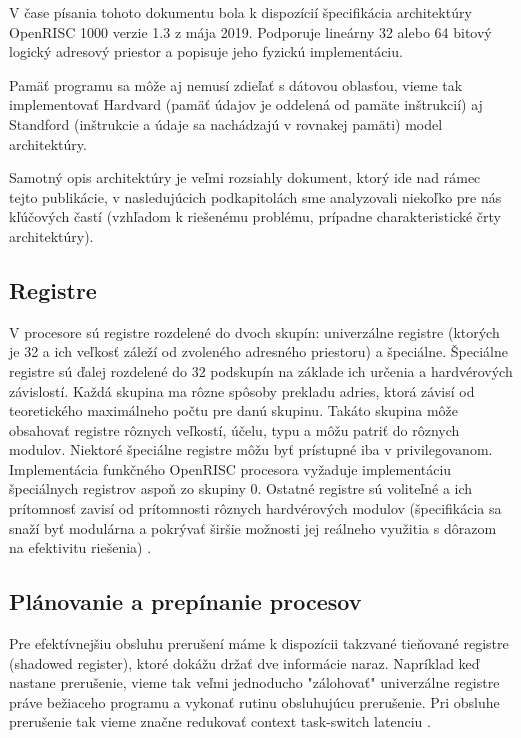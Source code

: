 \documentclass[conference]{IEEEtran}
\begin{document}
V čase písania tohoto dokumentu bola k dispozícií špecifikácia architektúry OpenRISC 1000 verzie 1.3 z mája 2019. Podporuje lineárny 32 alebo 64 bitový logický adresový priestor a popisuje jeho fyzickú implementáciu. 

Pamäť programu sa môže aj nemusí zdieľať s dátovou oblasťou, vieme tak implementovať Hardvard (pamäť údajov je oddelená od pamäte inštrukcií) aj Standford (inštrukcie a údaje sa nachádzajú v rovnakej pamäti) model architektúry.

Samotný opis architektúry je veľmi rozsiahly dokument, ktorý ide nad rámec tejto publikácie, v nasledujúcich podkapitolách sme analyzovali niekoľko pre nás kľúčových častí (vzhľadom k riešenému problému, prípadne charakteristické črty architektúry).

\subsection{Registre}

V procesore sú registre rozdelené do dvoch skupín: univerzálne registre (ktorých je 32 a ich veľkosť záleží od zvoleného adresného priestoru) a špeciálne. Špeciálne registre sú ďalej rozdelené do 32 podskupín na základe ich určenia a hardvérových závislostí. Každá skupina ma rôzne spôsoby prekladu adries, ktorá závisí od teoretického maximálneho počtu pre danú skupinu. Takáto skupina môže obsahovať registre rôznych veľkostí, účelu, typu a môžu patriť do rôznych modulov. Niektoré špeciálne registre môžu byť prístupné iba v privilegovanom. Implementácia funkčného OpenRISC procesora vyžaduje implementáciu špeciálnych registrov aspoň zo skupiny 0. Ostatné registre sú voliteľné a ich prítomnosť zavisí od prítomnosti rôznych hardvérových modulov (špecifikácia sa snaží byť modulárna a pokrývať širšie možnosti jej reálneho využitia s dôrazom na efektivitu riešenia) \cite{Lampret2019}.

\subsection{Plánovanie a prepínanie procesov}

Pre efektívnejšiu obsluhu prerušení máme k dispozícii takzvané tieňované registre (shadowed register), ktoré dokážu držať dve informácie naraz. Napríklad keď nastane prerušenie, vieme tak veľmi jednoducho "zálohovať" univerzálne registre práve bežiaceho programu a vykonať rutinu obsluhujúcu prerušenie. Pri obsluhe prerušenie tak vieme značne redukovať context task-switch latenciu \cite{Jayaraj2002ShadowRF}.
\end{document}
